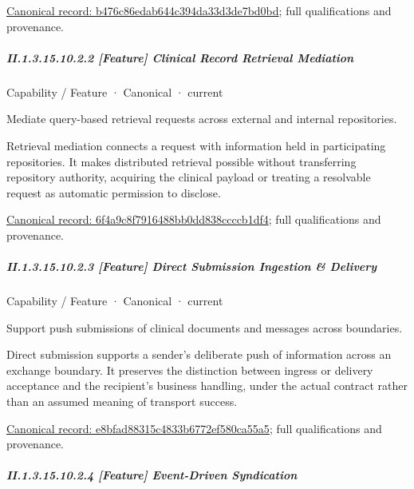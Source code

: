 {\footnotesize \href{../../../../continuum/strategy/capability/feature/b476c86edab644c394da33d3de7bd0bd.md}{Canonical record: b476c86edab644c394da33d3de7bd0bd}; full qualifications and provenance.}\par
\subparagraph*{II.1.3.15.10.2.2 [Feature] Clinical Record Retrieval Mediation}
\label{navigation:II.1.3.15.10.2.2}

\label{element:6f4a9c8f7916488bb0dd838ccccb1df4}
{\small Capability / Feature · Canonical · current}\par

Mediate query-based retrieval requests across external and internal repositories.



Retrieval mediation connects a request with information held in participating repositories. It makes distributed retrieval possible without transferring repository authority, acquiring the clinical payload or treating a resolvable request as automatic permission to disclose.


{\footnotesize \href{../../../../continuum/strategy/capability/feature/6f4a9c8f7916488bb0dd838ccccb1df4.md}{Canonical record: 6f4a9c8f7916488bb0dd838ccccb1df4}; full qualifications and provenance.}\par
\subparagraph*{II.1.3.15.10.2.3 [Feature] Direct Submission Ingestion \& Delivery}
\label{navigation:II.1.3.15.10.2.3}

\label{element:e8bfad88315c4833b6772ef580ca55a5}
{\small Capability / Feature · Canonical · current}\par

Support push submissions of clinical documents and messages across boundaries.



Direct submission supports a sender's deliberate push of information across an exchange boundary. It preserves the distinction between ingress or delivery acceptance and the recipient's business handling, under the actual contract rather than an assumed meaning of transport success.


{\footnotesize \href{../../../../continuum/strategy/capability/feature/e8bfad88315c4833b6772ef580ca55a5.md}{Canonical record: e8bfad88315c4833b6772ef580ca55a5}; full qualifications and provenance.}\par
\subparagraph*{II.1.3.15.10.2.4 [Feature] Event-Driven Syndication}
\label{navigation:II.1.3.15.10.2.4}

